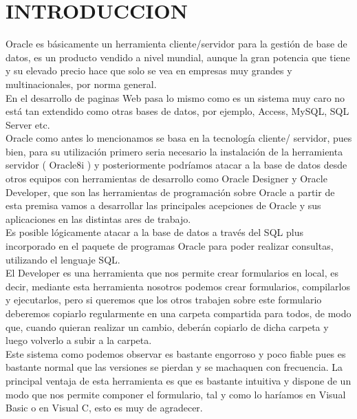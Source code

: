\section{INTRODUCCION}
\begin{enumerate}
\vspace{12pt}

Oracle es básicamente un herramienta cliente/servidor para la gestión de base de datos, es un producto vendido a nivel mundial, aunque la gran potencia que tiene y su elevado precio hace que solo se vea en empresas muy grandes y multinacionales, por norma general.\\

En el desarrollo de paginas Web pasa lo mismo como es un sistema muy caro no está tan extendido como otras bases de datos, por ejemplo, Access, MySQL, SQL Server etc.\\


Oracle como antes lo mencionamos se basa en la tecnología cliente/ servidor, pues bien, para su utilización primero seria necesario la instalación de la herramienta servidor ( Oracle8i ) y posteriormente podríamos atacar a la base de datos desde otros equipos con herramientas de desarrollo como Oracle Designer y Oracle Developer, que son las herramientas de programación sobre Oracle a partir de esta premisa vamos a desarrollar las principales acepciones de Oracle y sus aplicaciones en las distintas ares de trabajo.\\

Es posible lógicamente atacar a la base de datos a través del SQL plus incorporado en el paquete de programas Oracle para poder realizar consultas, utilizando el lenguaje SQL.\\

El Developer es una herramienta que nos permite crear formularios en local, es decir, mediante esta herramienta nosotros podemos crear formularios, compilarlos y ejecutarlos, pero si queremos que los otros trabajen sobre este formulario deberemos copiarlo regularmente en una carpeta compartida para todos, de modo que, cuando quieran realizar un cambio, deberán copiarlo de dicha carpeta y luego volverlo a subir a la carpeta.\\

Este sistema como podemos observar es bastante engorroso y poco fiable pues es bastante normal que las versiones se pierdan y se machaquen con frecuencia. La principal ventaja de esta herramienta es que es bastante intuitiva y dispone de un modo que nos permite componer el formulario, tal y como lo haríamos en Visual Basic o en Visual C, esto es muy de agradecer.\\

\end{enumerate}
